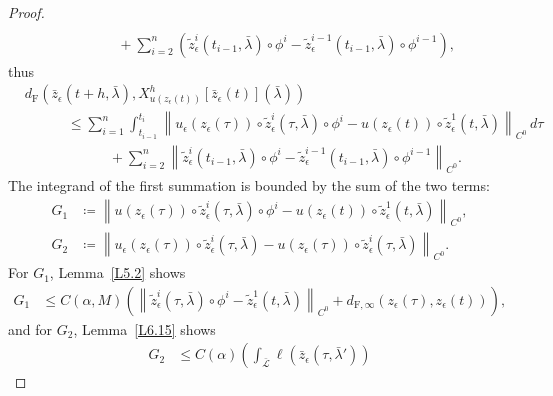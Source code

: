\documentclass[reqno,centertags,12pt]{amsart}
\theoremstyle{definition}
\numberwithin{equation}{section}
\newcommand{\norm}[1]{\left\|#1\right\|}
\begin{document}
\begin{proof}
\begin{align*}
        \\&\quad\quad\quad
        + \sum_{i=2}^{n}\left(
            \tilde{z}_{\epsilon}^{i}(t_{i-1},\bar{\lambda})\circ\phi^{i}
            - \tilde{z}_{\epsilon}^{i-1}(t_{i-1},\bar{\lambda})\circ\phi^{i-1}
        \right),
    \end{align*}
    thus
    \begin{align*}
        &d_{\mathrm{F}}\left(\bar{z}_{\epsilon}(t+h,\bar{\lambda}),
        X_{u(z_{\epsilon}(t))}^{h}[\bar{z}_{\epsilon}(t)](\bar{\lambda})\right)
        \\&\quad\quad\quad \leq
        \sum_{i=1}^{n} \int_{t_{i-1}}^{t_{i}}
        \norm{u_{\epsilon}(z_{\epsilon}(\tau))
        \circ \tilde{z}_{\epsilon}^{i}(\tau,\bar{\lambda})
        \circ \phi^{i}
        - u(z_{\epsilon}(t))\circ \tilde{z}_{\epsilon}^{1}(t,\bar{\lambda})}_{C^{0}}
        \,d\tau
        \\&\quad\quad\quad\quad\quad\quad
        + \sum_{i=2}^{n}\norm{
            \tilde{z}_{\epsilon}^{i}(t_{i-1},\bar{\lambda})\circ\phi^{i}
            - \tilde{z}_{\epsilon}^{i-1}(t_{i-1},\bar{\lambda})\circ\phi^{i-1}
        }_{C^{0}}.
    \end{align*}
    The integrand of the first summation is bounded by the sum of the two terms:
    \begin{align*}
        G_{1} &\coloneqq
        \norm{u(z_{\epsilon}(\tau))
        \circ \tilde{z}_{\epsilon}^{i}(\tau,\bar{\lambda})
        \circ \phi^{i}
        - u(z_{\epsilon}(t))
        \circ \tilde{z}_{\epsilon}^{1}(t,\bar{\lambda})}_{C^{0}}, \\
        G_{2} &\coloneqq
        \norm{u_{\epsilon}(z_{\epsilon}(\tau))\circ
        \tilde{z}_{\epsilon}^{i}(\tau,\bar{\lambda})
        - u(z_{\epsilon}(\tau))\circ
        \tilde{z}_{\epsilon}^{i}(\tau,\bar{\lambda})}_{C^{0}}.
    \end{align*}
    For $G_{1}$, Lemma~\ref{L5.2} shows
    \begin{align*}
        G_{1} &\leq C(\alpha,M)
        \left(
            \norm{\tilde{z}_{\epsilon}^{i}(\tau,\bar{\lambda})\circ\phi^{i}
            - \tilde{z}_{\epsilon}^{1}(t,\bar{\lambda})}_{C^{0}}
            + d_{\mathrm{F},\infty}(z_{\epsilon}(\tau), z_{\epsilon}(t))
        \right),
    \end{align*}
    and for $G_{2}$, Lemma~\ref{L6.15} shows
    \begin{align*}
        G_{2} &\leq C(\alpha)
        \left(
            \int_{\bar{\mathcal{L}}}\ell(\bar{z}_{\epsilon}(\tau,\bar{\lambda}'))

\end{align*}
\end{proof}
\end{document}
